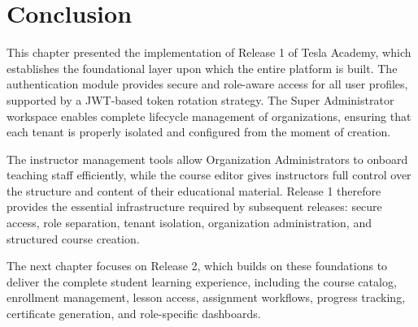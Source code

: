 \section*{Conclusion}

This chapter presented the implementation of Release 1 of Tesla Academy, which
establishes the foundational layer upon which the entire platform is built. The
authentication module provides secure and role-aware access for all user profiles,
supported by a JWT-based token rotation strategy. The Super Administrator workspace
enables complete lifecycle management of organizations, ensuring that each tenant is
properly isolated and configured from the moment of creation.

The instructor management tools allow Organization Administrators to onboard teaching
staff efficiently, while the course editor gives instructors full control over the structure
and content of their educational material. Release 1 therefore provides the essential
infrastructure required by subsequent releases: secure access, role separation, tenant
isolation, organization administration, and structured course creation.

The next chapter focuses on Release 2, which builds on these foundations to deliver
the complete student learning experience, including the course catalog, enrollment
management, lesson access, assignment workflows, progress tracking, certificate
generation, and role-specific dashboards.
 
